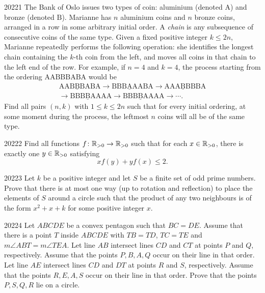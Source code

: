 
\begin{problem}{2022}{1}
The Bank of Oslo issues two types of coin: aluminium (denoted $\mathrm{A}$) and bronze (denoted $\mathrm{B}$). Marianne has $n$ aluminium coins and $n$ bronze coins, arranged in a row in some arbitrary initial order. A \emph{chain} is any subsequence of consecutive coins of the same type. Given a fixed positive integer $k\leq2n$, Marianne repeatedly performs the following operation: she identifies the longest chain containing the $k$-th coin from the left, and moves all coins in that chain to the left end of the row. For example, if $n=4$ and $k=4$, the process starting from the ordering $\mathrm{AABBBABA}$ would be
\[
\begin{gathered}
    \mathrm{AAB\underline{B}BABA}\to\mathrm{BBB\underline{A}AABA}\to\mathrm{AAA\underline{B}BBBA}\\
    \to\mathrm{BBB\underline{B}AAAA}\to\mathrm{BBB\underline{B}AAAA}\to\cdots.
\end{gathered}
\]
Find all pairs $(n, k)$ with $1\leq k\leq2n$ such that for every initial ordering, at some moment during the process, the leftmost $n$ coins will all be of the same type.
\end{problem}

\begin{problem}{2022}{2}
Find all functions $f\colon\mathbb{R}_{>0}\to\mathbb{R}_{>0}$ such that for each $x\in\mathbb{R}_{>0}$, there is exactly one $y\in\mathbb{R}_{>0}$ satisfying
\[
    xf(y)+yf(x)\leq2.
\]
\end{problem}

\begin{problem}{2022}{3}
Let $k$ be a positive integer and let $S$ be a finite set of odd prime numbers. Prove that there is at most one way (up to rotation and reflection) to place the elements of $S$ around a circle such that the product of any two neighbours is of the form $x^2+x+k$ for some positive integer $x$.
\end{problem}

\begin{problem}{2022}{4}
Let $ABCDE$ be a convex pentagon such that $BC=DE$. Assume that there is a point $T$ inside $ABCDE$ with $TB=TD$, $TC=TE$ and $m\angle ABT=m\angle TEA$. Let line $AB$ intersect lines $CD$ and $CT$ at points $P$ and $Q$, respectively. Assume that the points $P, B, A, Q$ occur on their line in that order. Let line $AE$ intersect lines $CD$ and $DT$ at points $R$ and $S$, respectively. Assume that the points $R, E, A, S$ occur on their line in that order. Prove that the points $P, S, Q, R$ lie on a circle.
\end{problem}

